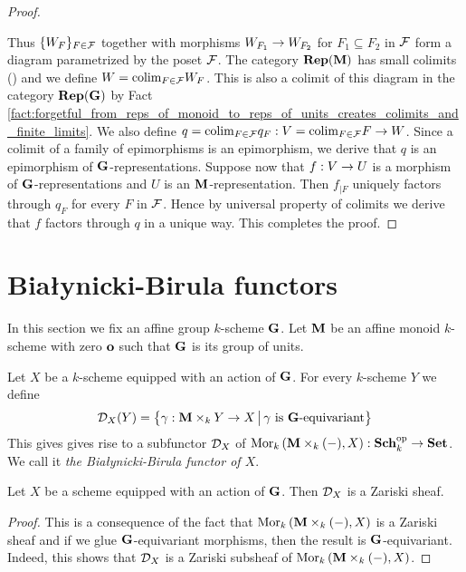 \begin{proof}
\begin{center}
\end{center}
Thus $\{W_F\}_{F\in {\mathcal F}}$ together with morphisms $W_{F_1}\rightarrow W_{F_2}$ for $F_1\subseteq F_2$ in ${\mathcal F}$ form a diagram parametrized by the poset ${\mathcal F}$. The category $\mathbf{Rep}(\mathbf{M})$ has small colimits ({\cite[Corollary 14.5]{Monoid_k_functors}}) and we define $W = \mathrm{colim}_{F\in {\mathcal F}}W_F$. This is also a colimit of this diagram in the category $\mathbf{Rep}(\mathbf{G})$ by Fact \ref{fact:forgetful_from_reps_of_monoid_to_reps_of_units_creates_colimits_and_finite_limits}. We also define $q = \mathrm{colim}_{F\in {\mathcal F}}q_F:V = \mathrm{colim}_{F\in {\mathcal F}}F \rightarrow W$.  Since a colimit of a family of epimorphisms is an epimorphism, we derive that $q$ is an epimorphism of $\mathbf{G}$-representations. Suppose now that $f:V\rightarrow U$ is a morphism of $\mathbf{G}$-representations and $U$ is an $\mathbf{M}$-representation. Then $f_{\mid F}$ uniquely factors through $q_F$ for every $F$ in ${\mathcal F}$. Hence by universal property of colimits we derive that $f$ factors through $q$ in a unique way. This completes the proof.
\end{proof}

\section{Bia{\l}ynicki-Birula functors}
\noindent
In this section we fix an affine group $k$-scheme $\mathbf{G}$. Let $\mathbf{M}$ be an affine monoid $k$-scheme with zero $\mathbf{o}$ such that $\mathbf{G}$ is its group of units.

\begin{definition}
Let $X$ be a $k$-scheme equipped with an action of $\mathbf{G}$. For every $k$-scheme $Y$ we define
$${\mathcal D}_X(Y) = \big\{\gamma:\mathbf{M}\times_kY\rightarrow X\,\big|\,\gamma\mbox{ is }\mathbf{G}\mbox{-equivariant}\big\}$$
This gives gives rise to a subfunctor ${\mathcal D}_X$ of $\mathrm{Mor}_{k}\left(\mathbf{M}\times_k(-),X\right):\mathbf{Sch}_k^{\mathrm{op}}\rightarrow \mathbf{Set}$. We call it \textit{the Bia{\l}ynicki-Birula functor of $X$}.
\end{definition}

\begin{fact}\label{fact:bb_is_zariski_sheaf}
Let $X$ be a scheme equipped with an action of $\mathbf{G}$. Then ${\mathcal D}_X$ is a Zariski sheaf.
\end{fact}
\begin{proof}
This is a consequence of the fact that $\mathrm{Mor}_{k}\left(\mathbf{M}\times_k(-),X\right)$ is a Zariski sheaf and if we glue $\mathbf{G}$-equivariant morphisms, then the result is $\mathbf{G}$-equivariant. Indeed, this shows that ${\mathcal D}_X$ is a Zariski subsheaf of $\mathrm{Mor}_{k}\left(\mathbf{M}\times_k(-),X\right)$.
\end{proof}

